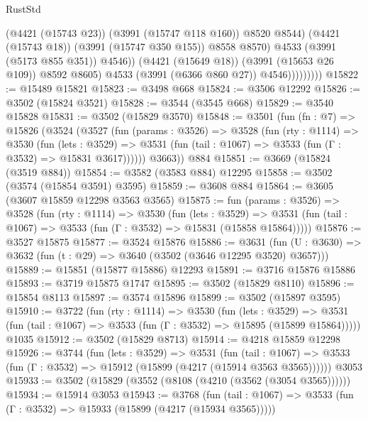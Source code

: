 \begin{lexlean}{RustStd}
\begin{coremodule}
                                (@4421 (@15743 @23))
                                (@3991 (@15747 @118 @160))
                                @8520
                                @8544)
                              (@4421 (@15743 @18))
                              (@3991 (@15747 @350 @155))
                              @8558
                              @8570)
                            @4533
                            (@3991 (@5173 @855 @351))
                            @4546))
                        (@4421 (@15649 @18))
                        (@3991 (@15653 @26 @109))
                        @8592
                        @8605)
                      @4533
                      (@3991 (@6366 @860 @27))
                      @4546)))))))))
@15822 := @15489 @15821
@15823 := @3498 @668
@15824 := @3506 @12292
@15826 := @3502 (@15824 @3521)
@15828 := @3544 (@3545 @668)
@15829 := @3540 @15828
@15831 := @3502 (@15829 @3570)
@15848 := @3501
    (fun (fn : @7) =>
    @15826
      (@3524
        (@3527
          (fun (params : @3526) =>
          @3528
            (fun (rty : @1114) =>
            @3530
              (fun (lets : @3529) =>
              @3531 (fun (tail : @1067) => @3533 (fun (Γ : @3532) => @15831 @3617))))))
        @3663))
    @884
@15851 := @3669 (@15824 (@3519 @884))
@15854 := @3582 (@3583 @884) @12295
@15858 := @3502 (@3574 (@15854 @3591) @3595)
@15859 := @3608 @884
@15864 := @3605 (@3607 @15859 @12298 @3563 @3565)
@15875 := fun (params : @3526) =>
  @3528
    (fun (rty : @1114) =>
    @3530
      (fun (lets : @3529) =>
      @3531 (fun (tail : @1067) => @3533 (fun (Γ : @3532) => @15831 (@15858 @15864)))))
@15876 := @3527 @15875
@15877 := @3524 @15876
@15886 := @3631
    (fun (U : @3630) => @3632 (fun (t : @29) => @3640 (@3502 (@3646 @12295 @3520) @3657)))
@15889 := @15851 (@15877 @15886) @12293
@15891 := @3716 @15876 @15886
@15893 := @3719 @15875 @1747
@15895 := @3502 (@15829 @8110)
@15896 := @15854 @8113
@15897 := @3574 @15896
@15899 := @3502 (@15897 @3595)
@15910 := @3722
    (fun (rty : @1114) =>
    @3530
      (fun (lets : @3529) =>
      @3531 (fun (tail : @1067) => @3533 (fun (Γ : @3532) => @15895 (@15899 @15864)))))
    @1035
@15912 := @3502 (@15829 @8713)
@15914 := @4218 @15859 @12298
@15926 := @3744
    (fun (lets : @3529) =>
    @3531
      (fun (tail : @1067) =>
      @3533 (fun (Γ : @3532) => @15912 (@15899 (@4217 (@15914 @3563 @3565))))))
    @3053
@15933 := @3502 (@15829 (@3552 (@8108 (@4210 (@3562 (@3054 @3565))))))
@15934 := @15914 @3053
@15943 := @3768
    (fun (tail : @1067) => @3533 (fun (Γ : @3532) => @15933 (@15899 (@4217 (@15934 @3565)))))

\end{coremodule}
\end{lexlean}
